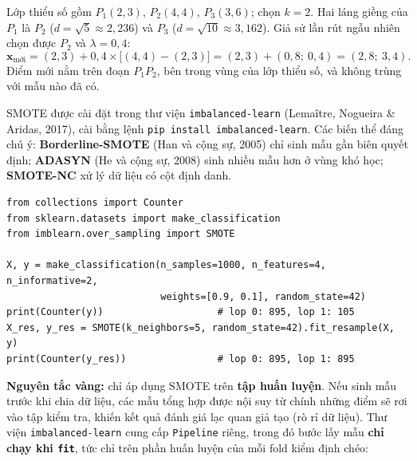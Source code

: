 \begin{example}
Lớp thiểu số gồm $P_1(2, 3)$, $P_2(4, 4)$, $P_3(3, 6)$; chọn $k = 2$. Hai láng giềng của $P_1$ là $P_2$ ($d = \sqrt{5} \approx 2{,}236$) và $P_3$ ($d = \sqrt{10} \approx 3{,}162$). Giả sử lần rút ngẫu nhiên chọn được $P_2$ và $\lambda = 0{,}4$:
\[
    \mathbf{x}_{\text{mới}} = (2, 3) + 0{,}4 \times \big[(4, 4) - (2, 3)\big] = (2, 3) + (0{,}8;\ 0{,}4) = (2{,}8;\ 3{,}4).
\]
Điểm mới nằm trên đoạn $P_1P_2$, bên trong vùng của lớp thiểu số, và không trùng với mẫu nào đã có.
\end{example}


SMOTE được cài đặt trong thư viện \texttt{imbalanced-learn} (Lemaître, Nogueira \& Aridas, 2017), cài bằng lệnh \texttt{pip install imbalanced-learn}. Các biến thể đáng chú ý: \textbf{Borderline-SMOTE} (Han và cộng sự, 2005) chỉ sinh mẫu gần biên quyết định; \textbf{ADASYN} (He và cộng sự, 2008) sinh nhiều mẫu hơn ở vùng khó học; \textbf{SMOTE-NC} xử lý dữ liệu có cột định danh.

\begin{lstlisting}[caption={SMOTE với imbalanced-learn}]
from collections import Counter
from sklearn.datasets import make_classification
from imblearn.over_sampling import SMOTE

X, y = make_classification(n_samples=1000, n_features=4, n_informative=2,
                           weights=[0.9, 0.1], random_state=42)
print(Counter(y))                    # lop 0: 895, lop 1: 105
X_res, y_res = SMOTE(k_neighbors=5, random_state=42).fit_resample(X, y)
print(Counter(y_res))                # lop 0: 895, lop 1: 895
\end{lstlisting}

\noindent\textbf{Nguyên tắc vàng:} chỉ áp dụng SMOTE trên \textbf{tập huấn luyện}. Nếu sinh mẫu trước khi chia dữ liệu, các mẫu tổng hợp được nội suy từ chính những điểm sẽ rơi vào tập kiểm tra, khiến kết quả đánh giá lạc quan giả tạo (rò rỉ dữ liệu). Thư viện \texttt{imbalanced-learn} cung cấp \texttt{Pipeline} riêng, trong đó bước lấy mẫu \textbf{chỉ chạy khi \texttt{fit}}, tức chỉ trên phần huấn luyện của mỗi fold kiểm định chéo:

